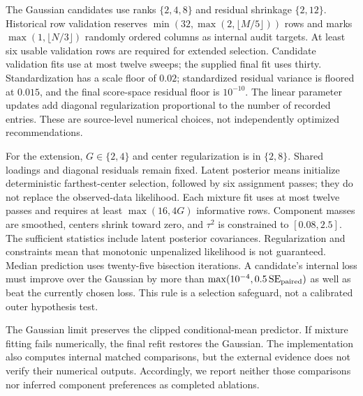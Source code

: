 \documentclass{article}
\begin{document}
The Gaussian candidates use ranks $\{2,4,8\}$ and residual shrinkage $\{2,12\}$. Historical row validation reserves $\min(32,\max(2,\lfloor M/5\rfloor))$ rows and marks $\max(1,\lfloor N/3\rfloor)$ randomly ordered columns as internal audit targets. At least six usable validation rows are required for extended selection. Candidate validation fits use at most twelve sweeps; the supplied final fit uses thirty. Standardization has a scale floor of $0.02$; standardized residual variance is floored at $0.015$, and the final score-space residual floor is $10^{-10}$. The linear parameter updates add diagonal regularization proportional to the number of recorded entries. These are source-level numerical choices, not independently optimized recommendations.

For the extension, $G\in\{2,4\}$ and center regularization is in $\{2,8\}$. Shared loadings and diagonal residuals remain fixed. Latent posterior means initialize deterministic farthest-center selection, followed by six assignment passes; they do not replace the observed-data likelihood. Each mixture fit uses at most twelve passes and requires at least $\max(16,4G)$ informative rows. Component masses are smoothed, centers shrink toward zero, and $\tau^2$ is constrained to $[0.08,2.5]$. The sufficient statistics include latent posterior covariances. Regularization and constraints mean that monotonic unpenalized likelihood is not guaranteed. Median prediction uses twenty-five bisection iterations. A candidate's internal loss must improve over the Gaussian by more than $\max(10^{-4},0.5\,\mathrm{SE}_{\rm paired})$ as well as beat the currently chosen loss. This rule is a selection safeguard, not a calibrated outer hypothesis test.

The Gaussian limit preserves the clipped conditional-mean predictor. If mixture fitting fails numerically, the final refit restores the Gaussian. The implementation also computes internal matched comparisons, but the external evidence does not verify their numerical outputs. Accordingly, we report neither those comparisons nor inferred component preferences as completed ablations.
\end{document}
